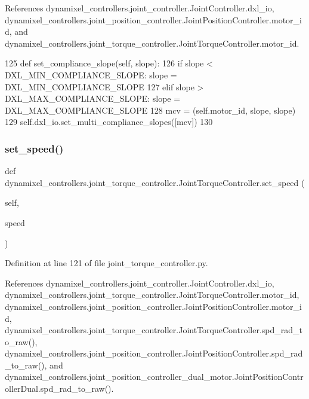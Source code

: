 References dynamixel\+\_\+controllers.\+joint\+\_\+controller.\+Joint\+Controller.\+dxl\+\_\+io, dynamixel\+\_\+controllers.\+joint\+\_\+position\+\_\+controller.\+Joint\+Position\+Controller.\+motor\+\_\+id, and dynamixel\+\_\+controllers.\+joint\+\_\+torque\+\_\+controller.\+Joint\+Torque\+Controller.\+motor\+\_\+id.


\begin{DoxyCode}
125     \textcolor{keyword}{def }set\_compliance\_slope(self, slope):
126         \textcolor{keywordflow}{if} slope < DXL\_MIN\_COMPLIANCE\_SLOPE: slope = DXL\_MIN\_COMPLIANCE\_SLOPE
127         \textcolor{keywordflow}{elif} slope > DXL\_MAX\_COMPLIANCE\_SLOPE: slope = DXL\_MAX\_COMPLIANCE\_SLOPE
128         mcv = (self.motor\_id, slope, slope)
129         self.dxl\_io.set\_multi\_compliance\_slopes([mcv])
130 
\end{DoxyCode}
\mbox{\label{classdynamixel__controllers_1_1joint__torque__controller_1_1_joint_torque_controller_a4bd0cb20fdf14a34c2dfd0eaada3d925}} 
\subsubsection{\texorpdfstring{set\+\_\+speed()}{set\_speed()}}
{\footnotesize\ttfamily def dynamixel\+\_\+controllers.\+joint\+\_\+torque\+\_\+controller.\+Joint\+Torque\+Controller.\+set\+\_\+speed (\begin{DoxyParamCaption}\item[{}]{self,  }\item[{}]{speed }\end{DoxyParamCaption})}



Definition at line 121 of file joint\+\_\+torque\+\_\+controller.\+py.



References dynamixel\+\_\+controllers.\+joint\+\_\+controller.\+Joint\+Controller.\+dxl\+\_\+io, dynamixel\+\_\+controllers.\+joint\+\_\+torque\+\_\+controller.\+Joint\+Torque\+Controller.\+motor\+\_\+id, dynamixel\+\_\+controllers.\+joint\+\_\+position\+\_\+controller.\+Joint\+Position\+Controller.\+motor\+\_\+id, dynamixel\+\_\+controllers.\+joint\+\_\+torque\+\_\+controller.\+Joint\+Torque\+Controller.\+spd\+\_\+rad\+\_\+to\+\_\+raw(), dynamixel\+\_\+controllers.\+joint\+\_\+position\+\_\+controller.\+Joint\+Position\+Controller.\+spd\+\_\+rad\+\_\+to\+\_\+raw(), and dynamixel\+\_\+controllers.\+joint\+\_\+position\+\_\+controller\+\_\+dual\+\_\+motor.\+Joint\+Position\+Controller\+Dual.\+spd\+\_\+rad\+\_\+to\+\_\+raw().


